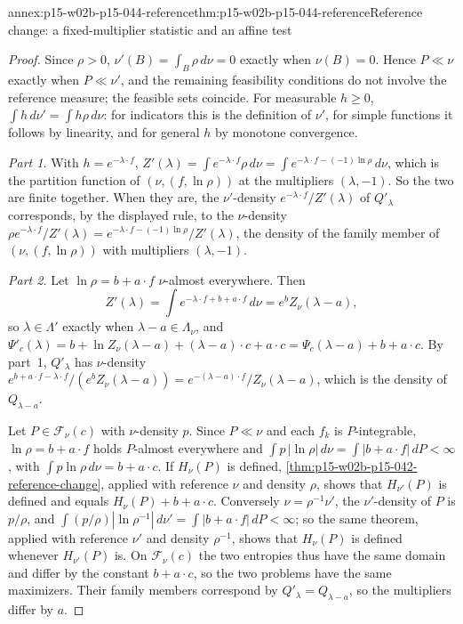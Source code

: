 \begin{annexitem}{annex:p15-w02b-p15-044-reference}{thm:p15-w02b-p15-044-reference}{Reference change: a fixed-multiplier statistic and an affine test}
\begin{proof}
Since \(\rho>0\), \(\nu'(B)=\int_B\rho\,d\nu=0\) exactly when \(\nu(B)=0\).
Hence \(P\ll\nu\) exactly when \(P\ll\nu'\), and the remaining feasibility
conditions do not involve the reference measure; the feasible sets
coincide. For measurable \(h\geq0\), \(\int h\,d\nu'=\int h\rho\,d\nu\): for
indicators this is the definition of \(\nu'\), for simple functions it
follows by linearity, and for general \(h\) by monotone convergence.

\emph{Part 1.} With \(h=e^{-\lambda\cdot f}\),
\(Z'(\lambda)=\int e^{-\lambda\cdot f}\rho\,d\nu=\int e^{-\lambda\cdot f-(-1)\ln\rho}\,d\nu\),
which is the partition function of \((\nu,(f,\ln\rho))\) at the multipliers
\((\lambda,-1)\). So the two are finite together. When they are, the
\(\nu'\)-density \(e^{-\lambda\cdot f}/Z'(\lambda)\) of \(Q'_\lambda\)
corresponds, by the displayed rule, to the \(\nu\)-density
\(\rho e^{-\lambda\cdot f}/Z'(\lambda)=e^{-\lambda\cdot f-(-1)\ln\rho}/Z'(\lambda)\),
the density of the family member of \((\nu,(f,\ln\rho))\) with multipliers
\((\lambda,-1)\).

\emph{Part 2.} Let \(\ln\rho=b+a\cdot f\) \(\nu\)-almost everywhere. Then
\[
 Z'(\lambda)=\int e^{-\lambda\cdot f+b+a\cdot f}\,d\nu=e^bZ_\nu(\lambda-a),
\]
so \(\lambda\in\Lambda'\) exactly when \(\lambda-a\in\Lambda_\nu\), and
\(\Psi'_c(\lambda)=b+\ln Z_\nu(\lambda-a)+(\lambda-a)\cdot c+a\cdot c
=\Psi_c(\lambda-a)+b+a\cdot c\). By part~1, \(Q'_\lambda\) has
\(\nu\)-density
\(e^{b+a\cdot f-\lambda\cdot f}/(e^bZ_\nu(\lambda-a))=e^{-(\lambda-a)\cdot f}/Z_\nu(\lambda-a)\),
which is the density of \(Q_{\lambda-a}\).

Let \(P\in\mathcal F_\nu(c)\) with \(\nu\)-density \(p\). Since \(P\ll\nu\)
and each \(f_k\) is \(P\)-integrable, \(\ln\rho=b+a\cdot f\) holds
\(P\)-almost everywhere and
\(\int p\,|\ln\rho|\,d\nu=\int|b+a\cdot f|\,dP<\infty\), with
\(\int p\ln\rho\,d\nu=b+a\cdot c\). If \(H_\nu(P)\) is defined,
\cref{thm:p15-w02b-p15-042-reference-change}, applied with reference
\(\nu\) and density \(\rho\), shows that \(H_{\nu'}(P)\) is defined and
equals \(H_\nu(P)+b+a\cdot c\). Conversely \(\nu=\rho^{-1}\nu'\), the
\(\nu'\)-density of \(P\) is \(p/\rho\), and
\(\int(p/\rho)|\ln\rho^{-1}|\,d\nu'=\int|b+a\cdot f|\,dP<\infty\); so the same
theorem, applied with reference \(\nu'\) and density \(\rho^{-1}\), shows that
\(H_\nu(P)\) is defined whenever \(H_{\nu'}(P)\) is. On \(\mathcal F_\nu(c)\)
the two entropies thus have the same domain and differ by the constant
\(b+a\cdot c\), so the two problems have the same maximizers. Their family
members correspond by \(Q'_\lambda=Q_{\lambda-a}\), so the multipliers
differ by \(a\).


\end{proof}
\end{annexitem}
